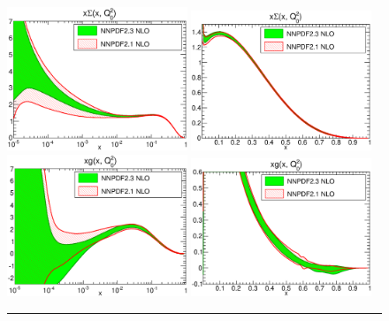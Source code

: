 \begin{figure}[hp!]
\centering
\includegraphics[width=0.48\textwidth]{6-LHCimpact/figs/xSinglet_Q_2_log-21-vs-23-nlo.eps}
\includegraphics[width=0.48\textwidth]{6-LHCimpact/figs/xSinglet_Q_2_lin-21-vs-23-nlo.eps}\\
\includegraphics[width=0.48\textwidth]{6-LHCimpact/figs/xg_Q_2_log-21-vs-23-nlo.eps}
\includegraphics[width=0.48\textwidth]{6-LHCimpact/figs/xg_Q_2_lin-21-vs-23-nlo.eps}

\noindent\rule[0.5ex]{\linewidth}{1pt}


\end{figure}

